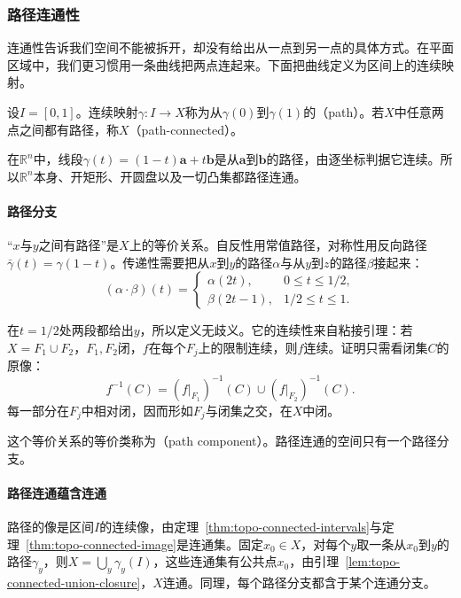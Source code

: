 \subsubsection{路径连通性}
\label{sec:topo-path-connected}

连通性告诉我们空间不能被拆开，却没有给出从一点到另一点的具体方式。在平面区域中，我们更习惯用一条曲线把两点连起来。下面把曲线定义为区间上的连续映射。

\begin{definition}[路径与路径连通]
\label{def:topo-path-connected}
设$I=[0,1]$。连续映射$\gamma:I\to X$称为从$\gamma(0)$到$\gamma(1)$的（path）。若$X$中任意两点之间都有路径，称$X$（path-connected）。
\end{definition}

在$\mathbb R^n$中，线段$\gamma(t)=(1-t)\bm a+t\bm b$是从$\bm a$到$\bm b$的路径，由逐坐标判据它连续。所以$\mathbb R^n$本身、开矩形、开圆盘以及一切凸集都路径连通。

\paragraph{路径分支}
“$x$与$y$之间有路径”是$X$上的等价关系。自反性用常值路径，对称性用反向路径$\bar\gamma(t)=\gamma(1-t)$。传递性需要把从$x$到$y$的路径$\alpha$与从$y$到$z$的路径$\beta$接起来：
\begin{equation}
(\alpha\cdot\beta)(t)=
\begin{cases}
\alpha(2t), & 0\leq t\leq 1/2,\\
\beta(2t-1), & 1/2\leq t\leq 1.
\end{cases}
\label{eq:topo-path-concatenation}
\end{equation}

在$t=1/2$处两段都给出$y$，所以定义无歧义。它的连续性来自粘接引理：若$X=F_1\cup F_2$，$F_1,F_2$闭，$f$在每个$F_j$上的限制连续，则$f$连续。证明只需看闭集$C$的原像：
\[
 f^{-1}(C)=(f|_{F_1})^{-1}(C)\cup(f|_{F_2})^{-1}(C).
\]
每一部分在$F_j$中相对闭，因而形如$F_j$与闭集之交，在$X$中闭。

这个等价关系的等价类称为（path component）。路径连通的空间只有一个路径分支。

\paragraph{路径连通蕴含连通}
路径的像是区间$I$的连续像，由定理~\ref{thm:topo-connected-intervals}与定理~\ref{thm:topo-connected-image}是连通集。固定$x_0\in X$，对每个$y$取一条从$x_0$到$y$的路径$\gamma_y$，则$X=\bigcup_y\gamma_y(I)$，这些连通集有公共点$x_0$，由引理~\ref{lem:topo-connected-union-closure}，$X$连通。同理，每个路径分支都含于某个连通分支。

